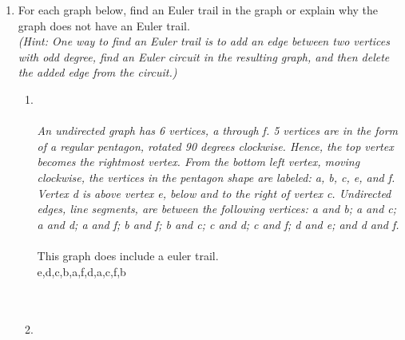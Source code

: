 \begin{enumerate}[label=(\alph*)]
\\\\

\newpage

\item
For each graph below, find an Euler trail in the graph or explain why the graph does not have an Euler trail.\\

{\it (Hint: One way to find an Euler trail is to add an edge between two vertices with odd degree, find an Euler circuit in the resulting graph, and then delete the added edge from the circuit.)}\\
\begin{enumerate}[label=(\roman*)]
\item
{}
\\\\
{\color{blue}{\bf Figure 11:} \emph{An undirected graph has 6 vertices, a through f. 5 vertices are in the form of a regular pentagon, rotated 90 degrees clockwise. Hence, the top vertex becomes the rightmost vertex. From the bottom left vertex, moving clockwise, the vertices in the pentagon shape are labeled: a, b, c, e, and f. Vertex d is above vertex e, below and to the right of vertex c. Undirected edges, line segments, are between the following vertices: a and b; a and c; a and d; a and f; b and f; b and c; c and d; c and f; d and e; and d and f.
}
}
\\\\
This graph does include a euler trail. \\

e,d,c,b,a,f,d,a,c,f,b \\

\\\\
\item {}
\end{enumerate}
\end{enumerate}
